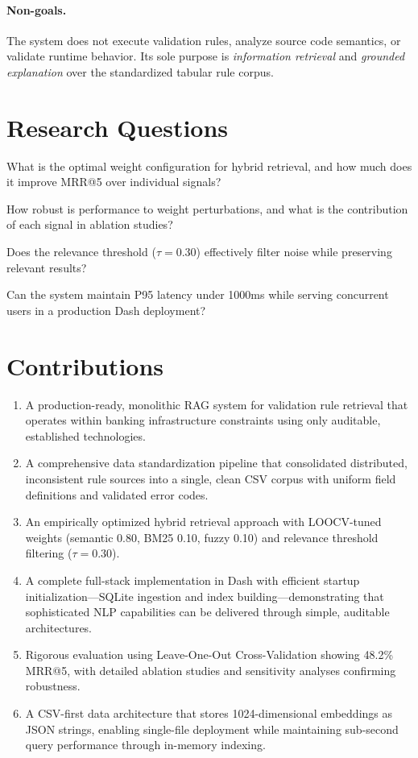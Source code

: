 \paragraph{Non-goals.} The system does not execute validation rules, analyze source code semantics, or validate runtime behavior. Its sole purpose is \emph{information retrieval} and \emph{grounded explanation} over the standardized tabular rule corpus.

\section{Research Questions}
\begin{description}[leftmargin=!,labelwidth=2.5cm,itemsep=2pt,topsep=2pt]
 \item[RQ1:] What is the optimal weight configuration for hybrid retrieval, and how much does it improve MRR@5 over individual signals?
 \item[RQ2:] How robust is performance to weight perturbations, and what is the contribution of each signal in ablation studies?
 \item[RQ3:] Does the relevance threshold ($\tau{=}0.30$) effectively filter noise while preserving relevant results?
 \item[RQ4:] Can the system maintain P95 latency under 1000ms while serving concurrent users in a production Dash deployment?
\end{description}

\section{Contributions}
\begin{enumerate}[leftmargin=*,itemsep=2pt,topsep=2pt]
 \item A production-ready, monolithic RAG system for validation rule retrieval that operates within banking infrastructure constraints using only auditable, established technologies.
 \item A comprehensive data standardization pipeline that consolidated distributed, inconsistent rule sources into a single, clean CSV corpus with uniform field definitions and validated error codes.
 \item An empirically optimized hybrid retrieval approach with LOOCV-tuned weights (semantic 0.80, BM25 0.10, fuzzy 0.10) and relevance threshold filtering ($\tau{=}0.30$).
 \item A complete full-stack implementation in Dash with efficient startup initialization—SQLite ingestion and index building—demonstrating that sophisticated NLP capabilities can be delivered through simple, auditable architectures.
 \item Rigorous evaluation using Leave-One-Out Cross-Validation showing 48.2\% MRR@5, with detailed ablation studies and sensitivity analyses confirming robustness.
 \item A CSV-first data architecture that stores 1024-dimensional embeddings as JSON strings, enabling single-file deployment while maintaining sub-second query performance through in-memory indexing.
\end{enumerate}

